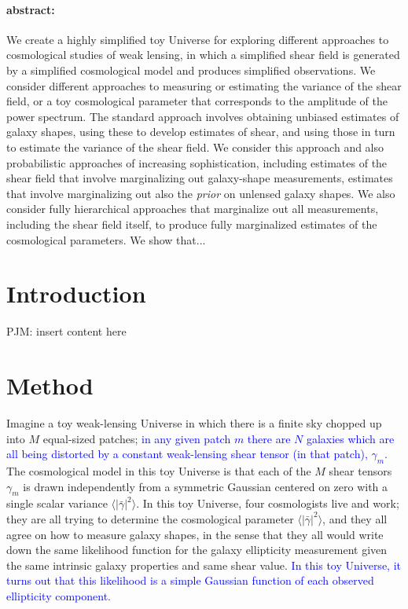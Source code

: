 \documentclass[12pt]{article}
\def\shearvar{\langle |\bar{\gamma}|^2\rangle}
\def\phil#1{\textcolor{blue}{#1}}
\begin{document}
\paragraph{abstract:}
We create a highly simplified toy Universe for exploring different
approaches to cosmological studies of weak lensing, in which a
simplified shear field is generated by a simplified cosmological model
and produces simplified observations.  We consider different
approaches to measuring or estimating the variance of the shear field,
or a toy cosmological parameter that corresponds to the amplitude of
the power spectrum.  The standard approach involves obtaining unbiased
estimates of galaxy shapes, using these to develop estimates of shear,
and using those in turn to estimate the variance of the shear field.
We consider this approach and also probabilistic approaches of
increasing sophistication, including estimates of the shear field that
involve marginalizing out galaxy-shape measurements, estimates that
involve marginalizing out also the \emph{prior} on unlensed galaxy
shapes.  We also consider fully hierarchical approaches that
marginalize out all measurements, including the shear field itself, to
produce fully marginalized estimates of the cosmological parameters.
We show that...

\section{Introduction}

PJM: insert content here

\section{Method}

Imagine a toy weak-lensing Universe in which there is a finite sky chopped up
into $M$ equal-sized patches; \phil{in any given patch $m$ there are $N$
galaxies which are all being  distorted by a constant weak-lensing shear
tensor (in that patch), $\gamma_m$}.  The cosmological model in this toy
Universe is that each of the $M$ shear tensors $\gamma_m$ is drawn
independently from a symmetric Gaussian centered on zero with a single scalar
variance $\shearvar$.  In this toy Universe, four cosmologists live and work;
they are all trying to determine the cosmological parameter $\shearvar$, and
they all agree on how to measure galaxy shapes, in the sense that they all
would write down the same likelihood function for the galaxy ellipticity
measurement given the same intrinsic galaxy properties and same shear value.
\phil{In this toy Universe, it turns out that this likelihood is a simple
Gaussian function of each observed ellipticity component.}
\end{document}
